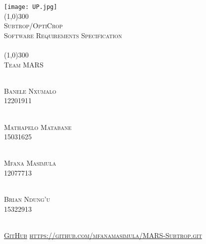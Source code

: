 \documentclass[runningheads,a4paper]{article}
\begin{document}
	\begin{titlepage}
		\begin{center}
			\texttt{[image: UP.jpg]}  \\
			[1cm]
			\line(1,0){300} \\
			[0.3cm]
			\textsc{\Large
				Subtrop/OptiCrop\\
				Software Requirements Specification\\
			\hfill \break 
			}\\
			[0.1cm]
			\line(1,0){300} \\
			[0.7cm]
			\textsc{\Large
				Team MARS
			} \\
			
			
			
		\end{center}
		
		\begin{center}
			\begin{multicols}{2}
				\textsc{\large\\
				Banele Nxumalo\\ 
					12201911\\ 
				}
				
				\textsc{\large\\
				Mathapelo Matabane\\
					 15031625\\ 
				}
				
			
				
				\columnbreak
				
				\textsc{\large\\
					 Mfana Masimula\\
					 12077713\\ 
					}
				
				
				\textsc{\large\\
					Brian Ndung'u\\
					15322913\\
				}
				
			\end{multicols}
			
			
			\textsc{	\\ \href{https://github.com/mfanamasimula/MARS-Subtrop}{GitHub}
				\url{https://github.com/mfanamasimula/MARS-Subtrop.git}}
			
		\end{center}
	\end{titlepage}
\end{document}
